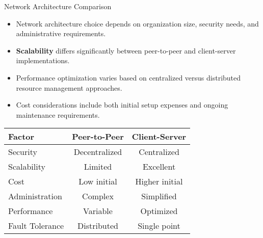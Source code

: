 \documentclass[aspectratio=169]{beamer}
\begin{document}
	\begin{frame}{Network Architecture Comparison}
		\begin{itemize}
			\item Network architecture choice depends on organization size, security needs, and administrative requirements.
			\item \textbf{Scalability} differs significantly between peer-to-peer and client-server implementations.
			\item Performance optimization varies based on centralized versus distributed resource management approaches.
			\item Cost considerations include both initial setup expenses and ongoing maintenance requirements.
		\end{itemize}
		
		\begin{center}
			\begin{tabular}{lcc}
				\toprule
				\textbf{Factor} & \textbf{Peer-to-Peer} & \textbf{Client-Server} \\
				\midrule
				Security & Decentralized & Centralized \\
				Scalability & Limited & Excellent \\
				Cost & Low initial & Higher initial \\
				Administration & Complex & Simplified \\
				Performance & Variable & Optimized \\
				Fault Tolerance & Distributed & Single point \\
				\bottomrule
			\end{tabular}
		\end{center}
	\end{frame}
	
\end{document}
